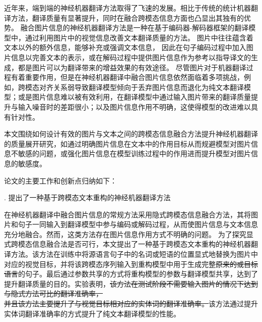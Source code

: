 近年来，端到端的神经机器翻译方法取得了飞速的发展。相比于传统的统计机器翻译方法，翻译质量有显著提升，同时在融合跨模态信息方面也凸显出其独有的优势。
融合图片信息的神经机器翻译方法是一种在基于编码器-解码器框架的翻译模型中，通过利用图片中的视觉信息改善文本翻译质量的方法。
图片中往往蕴含着文本以外的额外信息，能够补充或强调文本信息，%
因此在句子编码过程中加入图片信息以完善文本的表示，或在解码过程中提供图片信息作为参考以指导译文的生成，都是图片可以为翻译带来的增益效果的有效途径。
尽管图片对于机器翻译过程有着重要作用，但是在神经机器翻译中融合图片信息依然面临着多项挑战，例如，跨模态对齐关系弱导致翻译模型倾向于丢弃图片信息而退化为纯文本翻译模型；或是图片信息难以被有效利用，在翻译模型中通过输入图片带来的翻译质量提升与输入噪音时的差距很小；以及图片信息作用不明确，这使得模型的改进难以具有针对性。

本文围绕如何设计有效的图片与文本之间的跨模态信息融合方法提升神经机器翻译的质量展开研究，如通过明确图片信息在文本中的作用目标从而规避模型对图片信息不敏感的问题，或强化图片信息在模型训练过程中的作用进而提升模型对图片信息的敏感度。

论文的主要工作和创新点归纳如下：

{. 提出了一种基于跨模态文本重构的神经机器翻译方法}

在神经机器翻译中融合图片信息的常规方法采用隐式跨模态信息融合方法，其将图片和句子一同输入到翻译模型中参与编码或解码过程，从而使图片信息与文本信息充分地融合。然而，这类方法存在图片信息作用方式不明确的问题。%
为了探究显式跨模态信息融合法是否可行，本文提出了一种基于跨模态文本重构的神经机器翻译方法。该方法在训练中将源语言句子中的名词或短语的位置显式地替换为图片中对应的视觉目标，并将该跨模态序列输入到重构模型中用于生成完整\sout{原来的或目标语言}的句子。最后通过参数共享的方式将重构模型的参数与翻译模型共享，达到了提升翻译质量的目的。实验表明，\sout{该方法在测试阶段不需要输入图片的情况下达到与隐式方法可比的翻译准确率，}\\\sout{并且该方法主要提升了与视觉目标相对应的实体词的翻译准确率。}该方法通过提升实体词翻译准确率的方式提升了纯文本翻译模型的性能。

